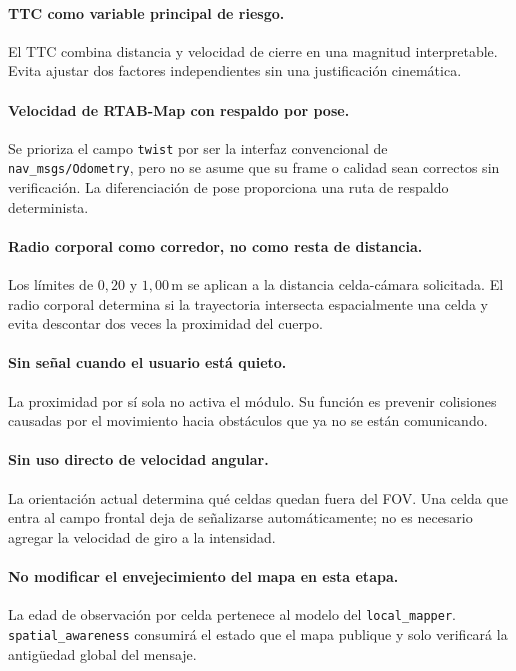 \paragraph{TTC como variable principal de riesgo.}
El TTC combina distancia y velocidad de cierre en una magnitud interpretable.
Evita ajustar dos factores independientes sin una justificación cinemática.

\paragraph{Velocidad de RTAB-Map con respaldo por pose.}
Se prioriza el campo \texttt{twist} por ser la interfaz convencional de
\texttt{nav\_msgs/Odometry}, pero no se asume que su frame o calidad sean
correctos sin verificación. La diferenciación de pose proporciona una ruta de
respaldo determinista.

\paragraph{Radio corporal como corredor, no como resta de distancia.}
Los límites de $0{,}20$ y $1{,}00\,\text{m}$ se aplican a la distancia
celda-cámara solicitada. El radio corporal determina si la trayectoria
intersecta espacialmente una celda y evita descontar dos veces la proximidad
del cuerpo.

\paragraph{Sin señal cuando el usuario está quieto.}
La proximidad por sí sola no activa el módulo. Su función es prevenir
colisiones causadas por el movimiento hacia obstáculos que ya no se están
comunicando.

\paragraph{Sin uso directo de velocidad angular.}
La orientación actual determina qué celdas quedan fuera del FOV. Una celda que
entra al campo frontal deja de señalizarse automáticamente; no es necesario
agregar la velocidad de giro a la intensidad.

\paragraph{No modificar el envejecimiento del mapa en esta etapa.}
La edad de observación por celda pertenece al modelo del
\texttt{local\_mapper}. \texttt{spatial\_awareness} consumirá el estado que el
mapa publique y solo verificará la antigüedad global del mensaje.

